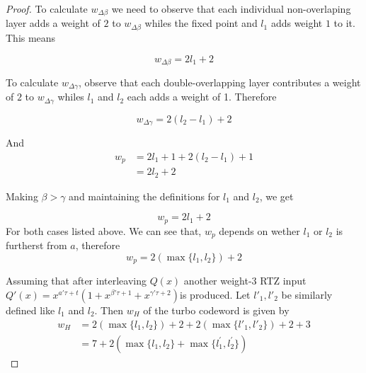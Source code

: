 \documentclass[fontsize=12pt]{article}
\theoremstyle{definition}
\begin{document}
\begin{proof}
To calculate $w_{\Delta \beta}$ we need to observe that each individual non-overlaping layer adds a weight of $2$ to $w_{\Delta \beta}$ whiles the fixed point and $l_1$ adds weight $1$ to it. This means

$$w_{\Delta \beta} = 2l_1+2$$

To calculate $w_{\Delta \gamma}$, observe that each double-overlapping layer contributes  a weight of $2$ to $w_{\Delta \gamma}$ whiles $l_1$ and $l_2$ each adds a weight of 1. Therefore

$$w_{\Delta \gamma} = 2(l_2-l_1)+2$$

And 
\begin{equation}
\begin{split}
w_p&=2l_1+1 + 2(l_2-l_1)+1\\
&=2l_2+2
\end{split}
\end{equation}

Making $\beta > \gamma$ and maintaining the definitions for $l_1$ and $l_2$, we get

$$w_p=2l_1+2$$
For both cases listed above.
We can see that, $w_p$ depends on wether $l_1$ or $l_2$ is furtherst from $a$, therefore
\begin{equation}
w_p=2(\max \{l_1,l_2\})+2
\end{equation}

Assuming that after interleaving $Q(x)$
 another weight-$3$ RTZ input 
  $Q'(x) =x^{a'\tau+t}(1+x^{\beta' \tau +1}+x^{\gamma' \tau +2})$is produced. Let $l'_1,l'_2$ be similarly defined  like $l_1$ and $l_2$. Then $w_H$ of the turbo codeword is given by
\begin{equation}
\begin{split}
w_H&=2(\max \{l_1,l_2\})+2+2(\max \{l'_1,l'_2\})+2+3\\
&=7+2(\max\{l_1,l_2\}+\max\{l^{\prime}_1,l^{\prime}_2\})
\end{split}
\end{equation}
\end{proof}
\end{document}
